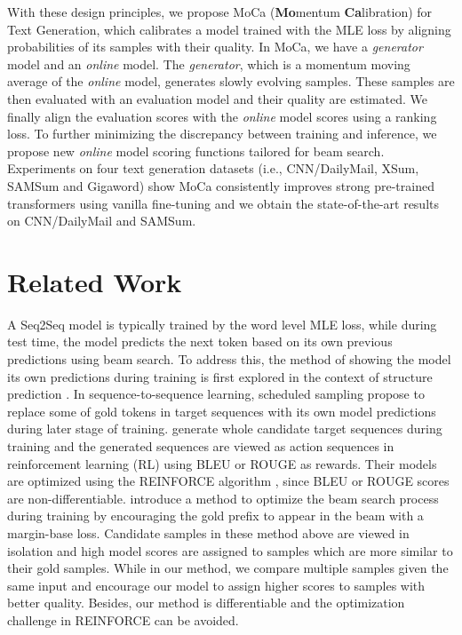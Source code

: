 \documentclass{article}
\begin{document}
With these design principles, we propose MoCa ({\bf Mo}mentum {\bf Ca}libration)  for Text Generation, which calibrates a model trained with the MLE loss by aligning probabilities of its samples with their quality. In MoCa, we have a \emph{generator} model and an \emph{online} model. The \emph{generator}, which is a momentum moving average of the \emph{online} model, generates slowly evolving samples. These samples are then evaluated with an evaluation model and their quality are estimated. We finally align the evaluation scores with the \emph{online} model scores using a ranking loss. To further minimizing the discrepancy between training and inference, we propose new \emph{online} model scoring functions tailored for beam search. Experiments on four text generation datasets (i.e., CNN/DailyMail, XSum, SAMSum and Gigaword) show MoCa consistently improves strong pre-trained transformers using vanilla fine-tuning and we obtain the state-of-the-art results on CNN/DailyMail and SAMSum.



\section{Related Work}
A Seq2Seq model is typically trained by the word level MLE loss, while during test time, the model predicts the next token based on its own previous predictions using beam search. To address this, the method of showing the model its own predictions during training is first explored in the context of structure prediction \cite{daume2009search}. In sequence-to-sequence learning, scheduled sampling \cite{bengio2015scheduled} propose to replace some of gold tokens in target sequences with its own model predictions during later stage of training. \cite{ranzato:2015:arxiv,edunov2017classical,bahdanau2016actor} generate whole candidate target sequences during training and the generated sequences are viewed as action sequences in reinforcement learning (RL) using BLEU or ROUGE as rewards. Their models are optimized using the REINFORCE algorithm \cite{williams1992simple}, since BLEU or ROUGE scores are non-differentiable. \cite{wiseman-rush-2016-sequence} introduce a method to optimize the beam search process during training by encouraging the gold prefix to appear in the beam with a margin-base loss. Candidate samples in these method above are viewed in isolation and high model scores are assigned to samples which are more similar to their gold samples. While in our method, we compare multiple samples given the same input and encourage our model to assign higher scores to samples with better quality. Besides, our method is differentiable and the optimization challenge in  REINFORCE can be avoided.
\end{document}
